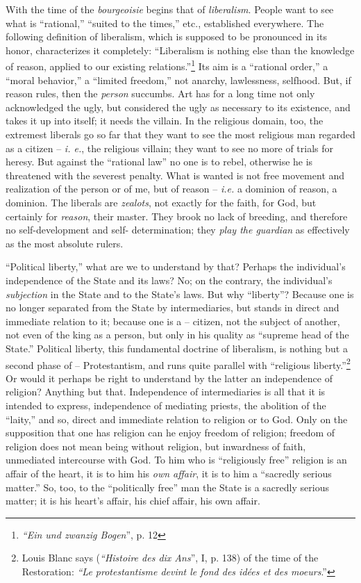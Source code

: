\documentclass[12pt,a4paper]{book}
\begin{document}
With the time of the \textit{bourgeoisie} begins that of \textit{liberalism}. 
People want to see what is ``rational,'' ``suited to the times,'' etc., 
established everywhere. The following definition of liberalism, which is 
supposed to be pronounced in its honor, characterizes it completely: 
``Liberalism is nothing else than the knowledge of reason, applied to our 
existing relations.''\footnote{\textit{``Ein und zwanzig Bogen}'', p. 12} 
Its aim is a ``rational order,'' a ``moral behavior,'' a ``limited 
freedom,'' not anarchy, lawlessness, selfhood. But, if reason rules, then the 
\textit{person} succumbs. Art has for a long time not only acknowledged the 
ugly, but considered the ugly as necessary to its existence, and takes it up 
into itself; it needs the villain. In the religious domain, too, the extremest 
liberals go so far that they want to see the most religious man regarded as a 
citizen -- \textit{i. e.}, the religious villain; they want to see no more of 
trials for heresy. But against the ``rational law'' no one is to rebel, 
otherwise he is threatened with the severest penalty. What is wanted is not 
free movement and realization of the person or of me, but of reason -- 
\textit{i.e.} a dominion of reason, a dominion. The liberals are 
\textit{zealots}, not exactly for the faith, for God, but certainly for 
\textit{reason}, their master. They brook no lack of breeding, and therefore 
no self-development and self- determination; they \textit{play the guardian} 
as effectively as the most absolute rulers.

``Political liberty,'' what are we to understand by that? Perhaps the 
individual's independence of the State and its laws? No; on the contrary, the 
individual's \textit{subjection} in the State and to the State's laws. But why 
``liberty''? Because one is no longer separated from the State by 
intermediaries, but stands in direct and immediate relation to it; because one 
is a -- citizen, not the subject of another, not even of the king as a person, 
but only in his quality as ``supreme head of the State.'' Political liberty, 
this fundamental doctrine of liberalism, is nothing but a second phase of -- 
Protestantism, and runs quite parallel with ``religious 
liberty.''\footnote{Louis Blanc says (\textit{``Histoire des dix Ans}'', I, 
p. 138) of the time of the Restoration: \textit{``Le protestantisme devint le 
fond des id\'ees et des moeurs}.''} Or would it perhaps be right to 
understand by the latter an independence of religion? Anything but that. 
Independence of intermediaries is all that it is intended to express, 
independence of mediating priests, the abolition of the ``laity,'' and so, 
direct and immediate relation to religion or to God. Only on the supposition 
that one has religion can he enjoy freedom of religion; freedom of religion 
does not mean being without religion, but inwardness of faith, unmediated 
intercourse with God. To him who is ``religiously free'' religion is an 
affair of the heart, it is to him his \textit{own affair}, it is to him a 
``sacredly serious matter.'' So, too, to the ``politically free'' man the 
State is a sacredly serious matter; it is his heart's affair, his chief 
affair, his own affair.
\end{document}
